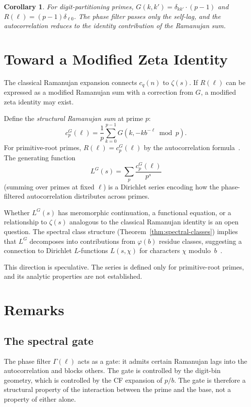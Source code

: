 \documentclass[12pt]{amsart}
\newtheorem{corollary}[theorem]{Corollary}
\theoremstyle{definition}
\theoremstyle{remark}
\begin{document}
\begin{corollary}
For digit-partitioning primes, $G(k,k') = \delta_{kk'} \cdot
(p{-}1)$ and $R(\ell) = (p{-}1)\delta_{\ell 0}$. The phase
filter passes only the self-lag, and the autocorrelation reduces
to the identity contribution of the Ramanujan sum.
\end{corollary}

\section{Toward a Modified Zeta Identity}

The classical Ramanujan expansion connects $c_q(n)$ to $\zeta(s)$.
If $R(\ell)$ can be expressed as a modified Ramanujan sum with a
correction from $G$, a modified zeta identity may exist.

Define the \emph{structural Ramanujan sum} at prime $p$:
\[
c_p^{G}(\ell) = \frac{1}{p} \sum_{k=0}^{p-1}
G(k, -kb^{-\ell} \bmod p).
\]
For primitive-root primes, $R(\ell) = c_p^{G}(\ell)$ by the
autocorrelation formula~\cite{paper9}. The generating function
\[
L^{G}(s) = \sum_{p} \frac{c_p^{G}(\ell)}{p^s}
\]
(summing over primes at fixed $\ell$) is a Dirichlet series
encoding how the phase-filtered autocorrelation distributes across
primes.

Whether $L^{G}(s)$ has meromorphic continuation, a functional
equation, or a relationship to $\zeta(s)$ analogous to the
classical Ramanujan identity is an open question. The spectral
class structure (Theorem~\ref{thm:spectral-classes}) implies that
$L^{G}$ decomposes into contributions from $\varphi(b)$ residue
classes, suggesting a connection to Dirichlet $L$-functions
$L(s, \chi)$ for characters $\chi$ modulo~$b$~\cite{iwaniec}.

This direction is speculative. The series is defined only
for primitive-root primes, and its analytic properties are
not established.

\section{Remarks}

\subsection*{The spectral gate}

The phase filter $\Gamma(\ell)$ acts as a gate: it admits certain
Ramanujan lags into the autocorrelation and blocks others. The
gate is controlled by the digit-bin geometry, which is controlled
by the CF expansion of $p/b$. The gate is therefore a structural
property of the interaction between the prime and the base, not a
property of either alone.
\end{document}
